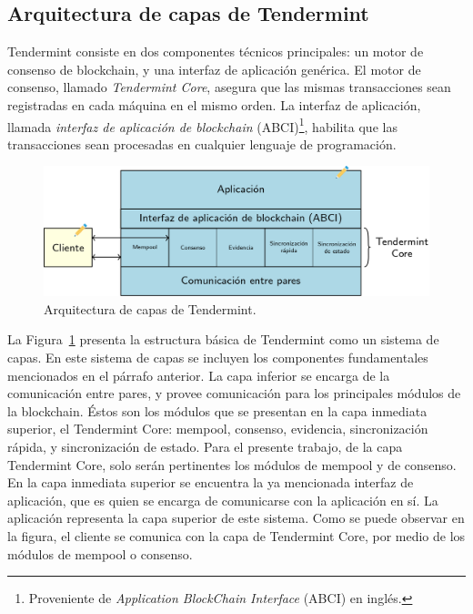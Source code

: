 \subsection{Arquitectura de capas de Tendermint}\label{subsec:layers}
Tendermint consiste en dos componentes técnicos principales: un motor de consenso de blockchain, y una interfaz
de aplicación genérica.
%
El motor de consenso, llamado \textit{Tendermint Core}, asegura que las mismas transacciones sean registradas en cada
máquina en el mismo orden.
%
La interfaz de aplicación, llamada \textit{interfaz de aplicación de blockchain} (ABCI)\footnote{Proveniente de \textit{Application
BlockChain Interface} (ABCI) en inglés.}, habilita que las transacciones
sean procesadas en cualquier lenguaje de programación.

\begin{figure}
  \centering
  \includegraphics[scale=0.3]{figures/tendermint-layers.png}
  \caption{Arquitectura de capas de Tendermint.}
  \label{fig:tendermint-architecture}
\end{figure}

La Figura~\ref{fig:tendermint-architecture} presenta la estructura básica de Tendermint como un sistema de capas.
%
En este sistema de capas se incluyen los componentes fundamentales mencionados en el párrafo anterior.
%
La capa inferior se encarga de la comunicación entre pares, y provee comunicación para los principales
módulos de la blockchain.
%
Éstos son los módulos que se presentan en la capa inmediata superior, el
Tendermint Core: mempool, consenso, evidencia, sincronización rápida, y sincronización de estado.
%
Para el presente trabajo, de la capa Tendermint Core, solo serán pertinentes los módulos de mempool y de consenso.
%
En la capa inmediata superior se encuentra la ya mencionada interfaz de aplicación, que es quien se encarga de comunicarse
con la aplicación en sí.
%
La aplicación representa la capa superior de este sistema.
%
Como se puede observar en la figura, el cliente se comunica con la capa de Tendermint Core, por medio de los
módulos de mempool o consenso. 

